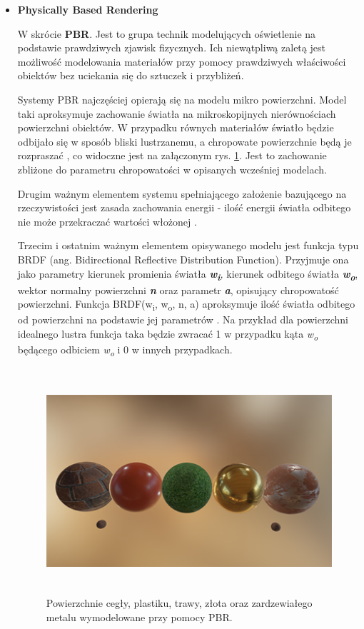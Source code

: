 \begin{itemize}
	\vfill
	\clearpage
	
	\item \textbf{Physically Based Rendering}
	
	W skrócie \textbf{PBR}. Jest to grupa technik modelujących oświetlenie na podstawie prawdziwych zjawisk fizycznych. Ich niewątpliwą zaletą jest możliwość modelowania materiałów przy pomocy prawdziwych właściwości obiektów bez uciekania się do sztuczek i przybliżeń.
	
	Systemy PBR najczęściej opierają się na modelu mikro powierzchni. Model taki aproksymuje zachowanie światła na mikroskopijnych nierównościach powierzchni obiektów. W przypadku równych materiałów światło będzie odbijało się w sposób bliski lustrzanemu, a chropowate powierzchnie będą je rozpraszać \cite{learnopengl:pbr:2024}, co widoczne jest na załączonym rys. \ref{intro-PBR}. Jest to zachowanie zbliżone do parametru chropowatości w opisanych wcześniej modelach.

	Drugim ważnym elementem systemu spełniającego założenie bazującego na rzeczywistości jest zasada zachowania energii - ilość energii światła odbitego nie może przekraczać wartości włożonej \cite{learnopengl:pbr:2024}.

	Trzecim i ostatnim ważnym elementem opisywanego modelu jest funkcja typu BRDF (ang. Bidirectional Reflective Distribution Function). Przyjmuje ona jako parametry kierunek promienia światła \emph{\textbf{w\textsubscript{i}},} kierunek odbitego światła \emph{\textbf{w\textsubscript{o}}}, wektor normalny powierzchni \emph{\textbf{n}} oraz parametr \emph{\textbf{a}}, opisujący chropowatość powierzchni. Funkcja BRDF(w\textsubscript{i}, w\textsubscript{o}, n, a) aproksymuje ilość światła odbitego od powierzchni na podstawie jej parametrów \cite{learnopengl:pbr:2024}. Na przykład dla powierzchni idealnego lustra funkcja taka będzie zwracać 1 w przypadku kąta \emph{w\textsubscript{o}} będącego odbiciem \emph{w\textsubscript{o}} i 0 w innych przypadkach.
	
	\begin{figure}[htbp]
		\centering
		\includegraphics[width=5.425in,height=3.2752in]{images/8_pbr_surfaces.png}
		\caption{Powierzchnie cegły, plastiku, trawy, złota oraz zardzewiałego metalu wymodelowane przy pomocy PBR. \cite{learnopengl:pbr:2024}}
		\label{intro-PBR}
	\end{figure}
\end{itemize}

